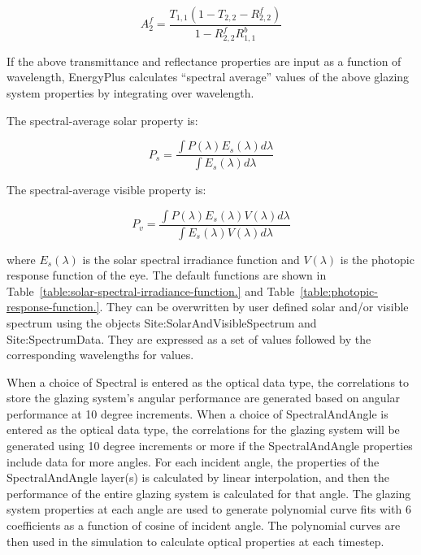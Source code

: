 \begin{equation}
A_2^f = \frac{{{T_{1,1}}(1 - {T_{2,2}} - R_{2,2}^f)}}{{1 - R_{2,2}^fR_{1,1}^b}}
\end{equation}

If the above transmittance and reflectance properties are input as a function of wavelength, EnergyPlus calculates ``spectral average'' values of the above glazing system properties by integrating over wavelength.

The spectral-average solar property is:

\begin{equation}
{P_s} = \frac{{\int {P(\lambda ){E_s}(\lambda )d\lambda } }}{{\int {{E_s}(\lambda )d\lambda } }}
\end{equation}

The spectral-average visible property is:

\begin{equation}
{P_v} = \frac{{\int {P(\lambda ){E_s}(\lambda )V(\lambda )d\lambda } }}{{\int {{E_s}(\lambda )V(\lambda )d\lambda } }}
\end{equation}

where \({E_s}(\lambda )\) is the solar spectral irradiance function and \(V(\lambda )\) is the photopic response function of the eye. The default functions are shown in Table~\ref{table:solar-spectral-irradiance-function.} and Table~\ref{table:photopic-response-function.}. They can be overwritten by user defined solar and/or visible spectrum using the objects Site:SolarAndVisibleSpectrum and Site:SpectrumData. They are expressed as a set of values followed by the corresponding wavelengths for values.

When a choice of Spectral is entered as the optical data type, the correlations to store the glazing system's angular performance are generated based on angular performance at 10 degree increments. When a choice of SpectralAndAngle is entered as the optical data type, the correlations for the glazing system will be generated using 10 degree increments or more if the SpectralAndAngle properties include data for more angles.  For each incident angle, the properties of the SpectralAndAngle layer(s) is calculated by linear interpolation, and then the performance of the entire glazing system is calculated for that angle.  The glazing system properties at each angle are used to generate polynomial curve fits with 6 coefficients as a function of cosine of incident angle. The polynomial curves are then used in the simulation to calculate optical properties at each timestep.

